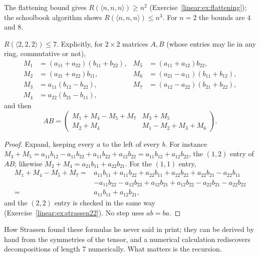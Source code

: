 The flattening bound gives $R(\langle n,n,n\rangle)\ge n^2$ (Exercise~\ref{linear:ex:flattening}); the schoolbook algorithm shows
$R(\langle n,n,n\rangle)\le n^3$. For $n=2$ the bounds are $4$ and $8$.

\begin{theorem}[Strassen, 1969]\label{linear:thm:strassen}
$R(\langle2,2,2\rangle)\le7$. Explicitly, for $2\times2$ matrices $A,B$ (whose entries may lie in any ring, commutative or not),
\[
\begin{aligned}
M_1&=(a_{11}+a_{22})(b_{11}+b_{22}),&M_5&=(a_{11}+a_{12})b_{22},\\
M_2&=(a_{21}+a_{22})b_{11},&M_6&=(a_{21}-a_{11})(b_{11}+b_{12}),\\
M_3&=a_{11}(b_{12}-b_{22}),&M_7&=(a_{12}-a_{22})(b_{21}+b_{22}),\\
M_4&=a_{22}(b_{21}-b_{11}),
\end{aligned}
\]
and then
\[
AB=\begin{pmatrix}M_1+M_4-M_5+M_7&M_3+M_5\\M_2+M_4&M_1-M_2+M_3+M_6\end{pmatrix}.
\]
\end{theorem}
\begin{proof}
Expand, keeping every $a$ to the left of every $b$. For instance $M_3+M_5=a_{11}b_{12}-a_{11}b_{22}+a_{11}b_{22}+a_{12}b_{22}=
a_{11}b_{12}+a_{12}b_{22}$, the $(1,2)$ entry of $AB$; likewise $M_2+M_4=a_{21}b_{11}+a_{22}b_{21}$. For the $(1,1)$ entry,
\[
\begin{aligned}
M_1+M_4-M_5+M_7={}&a_{11}b_{11}+a_{11}b_{22}+a_{22}b_{11}+a_{22}b_{22}+a_{22}b_{21}-a_{22}b_{11}\\
&-a_{11}b_{22}-a_{12}b_{22}+a_{12}b_{21}+a_{12}b_{22}-a_{22}b_{21}-a_{22}b_{22}\\
={}&a_{11}b_{11}+a_{12}b_{21},
\end{aligned}
\]
and the $(2,2)$ entry is checked in the same way (Exercise~\ref{linear:ex:strassen22}). No step uses $ab=ba$.
\end{proof}

How Strassen found these formulas he never said in print; they can be derived by hand from the symmetries of the tensor, and
a numerical calculation rediscovers decompositions of length $7$ numerically. What matters is the recursion.

